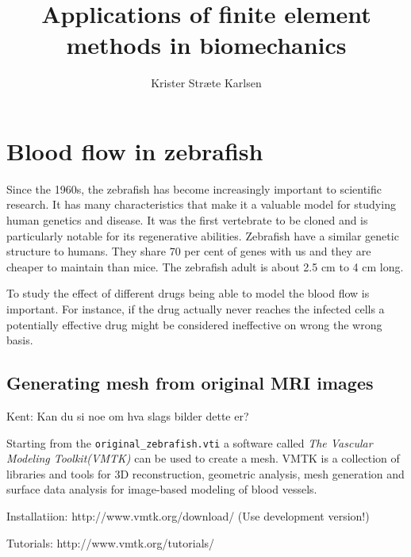 \documentclass[epsfig,11pt]{article}
\title{Applications of finite element methods in biomechanics}
\author{Krister Stræte Karlsen}
\begin{document}
\maketitle

\section{Blood flow in zebrafish}

Since the 1960s, the zebrafish has become increasingly important to scientific research. It has many characteristics that make it a valuable model for studying human genetics and disease. It was the first vertebrate to be cloned and is particularly notable for its regenerative abilities. Zebrafish have a similar genetic structure to humans. They share 70 per cent of genes with us and they are cheaper to maintain than mice. The zebrafish adult is about 2.5 cm to 4 cm long. 

To study the effect of different drugs being able to model the blood flow is important. For instance, if the drug actually never reaches the infected cells a potentially effective drug might be considered ineffective on wrong the wrong basis. 

\subsection{Generating mesh from original MRI images}

{\color{red} Kent: Kan du si noe om hva slags bilder dette er?}

Starting from the \texttt{original\_zebrafish.vti} a software called \emph{The Vascular Modeling Toolkit(VMTK)} can be used to create a mesh. VMTK is a collection of libraries and tools for 3D reconstruction, geometric analysis, mesh generation and surface data analysis for image-based modeling of blood vessels.

Installatiion: http://www.vmtk.org/download/ (Use development version!) 

Tutorials: http://www.vmtk.org/tutorials/
\end{document}
